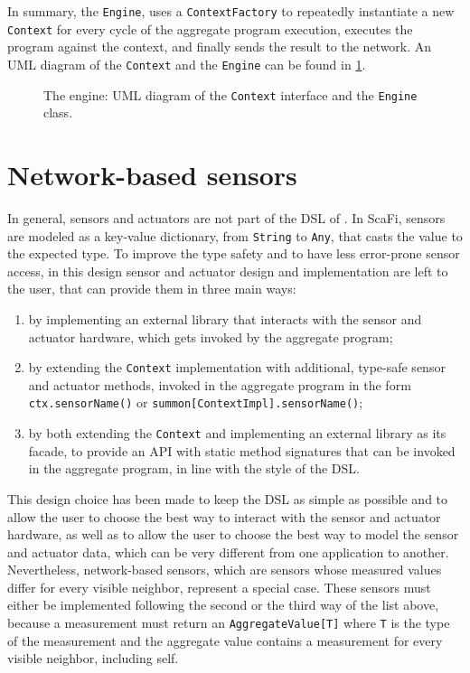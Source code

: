 In summary, the \texttt{Engine}, uses a \texttt{ContextFactory} to repeatedly instantiate a new \texttt{Context} for every cycle of the aggregate program execution, executes the program against the context, and finally sends the result to the network.
%
An \ac{UML} diagram of the \texttt{Context} and the \texttt{Engine} can be found in \cref{fig:engine-diagram}.

\begin{figure}
    \centering
    \caption{The engine: \ac{UML} diagram of the \texttt{Context} interface and the \texttt{Engine} class.}
    \label{fig:engine-diagram}
    \bigskip
    \resizebox{\linewidth}{!}{
        
    }
\end{figure}


\section{Network-based sensors} \label{chap:design->sec:network-based-sensors}

In general, sensors and actuators are not part of the \ac{DSL} of \this.
%
In ScaFi, sensors are modeled as a key-value dictionary, from \texttt{String} to \texttt{Any}, that casts the value to the expected type.
%
To improve the type safety and to have less error-prone sensor access, in this design sensor and actuator design and implementation are left to the user, that can provide them in three main ways:
\begin{enumerate}
    \item by implementing an external library that interacts with the sensor and actuator hardware, which gets invoked by the aggregate program;
    \item by extending the \texttt{Context} implementation with additional, type-safe sensor and actuator methods, invoked in the aggregate program in the form \texttt{ctx.sensorName()} or \texttt{summon[ContextImpl].sensorName()};
    \item by both extending the \texttt{Context} and implementing an external library as its facade, to provide an \ac{API} with static method signatures that can be invoked in the aggregate program, in line with the style of the \ac{DSL}.
\end{enumerate}
%
This design choice has been made to keep the \ac{DSL} as simple as possible and to allow the user to choose the best way to interact with the sensor and actuator hardware, as well as to allow the user to choose the best way to model the sensor and actuator data, which can be very different from one application to another.
%
Nevertheless, network-based sensors, which are sensors whose measured values differ for every visible neighbor, represent a special case.
%
These sensors must either be implemented following the second or the third way of the list above, because a measurement must return an \texttt{AggregateValue[T]} where \texttt{T} is the type of the measurement and the aggregate value contains a measurement for every visible neighbor, including self.

